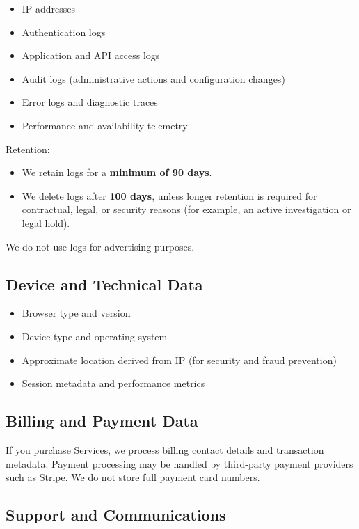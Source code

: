 \documentclass[11pt]{article}
\begin{document}
\begin{itemize}
\item IP addresses
\item Authentication logs
\item Application and API access logs
\item Audit logs (administrative actions and configuration changes)
\item Error logs and diagnostic traces
\item Performance and availability telemetry
\end{itemize}

Retention:

\begin{itemize}
\item We retain logs for a \textbf{minimum of 90 days}.
\item We delete logs after \textbf{100 days}, unless longer retention is required for contractual, legal, or security reasons (for example, an active investigation or legal hold).
\end{itemize}

We do not use logs for advertising purposes.

\subsection{Device and Technical Data}

\begin{itemize}
\item Browser type and version
\item Device type and operating system
\item Approximate location derived from IP (for security and fraud prevention)
\item Session metadata and performance metrics
\end{itemize}

\subsection{Billing and Payment Data}

If you purchase Services, we process billing contact details and transaction metadata. Payment processing may be handled by third-party payment providers such as Stripe. We do not store full payment card numbers.

\subsection{Support and Communications}
\end{document}
